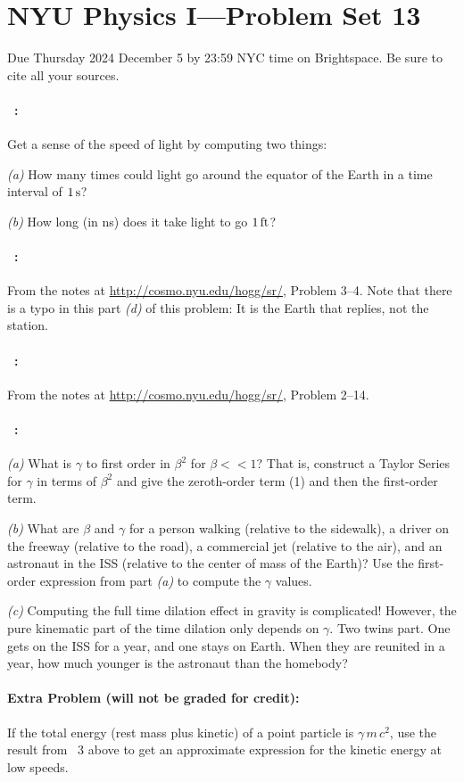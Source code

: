 \documentclass[12pt]{article}
\begin{document}
\section*{NYU Physics I---Problem Set 13}

Due Thursday 2024 December 5 by 23:59 NYC time on Brightspace.
Be sure to cite all your sources.

\paragraph{\problemname~\theproblem:}%
Get a sense of the speed of light by computing two things:

\textsl{(a)} How many times could light go around the equator of the Earth
in a time interval of $1\,\mathrm{s}$?

\textsl{(b)} How long (in ns) does it take light to go $1\,\mathrm{ft}$?

\paragraph{\problemname~\theproblem:}%
From the notes at \url{http://cosmo.nyu.edu/hogg/sr/},
Problem 3--4. Note that there is a typo in this part \textsl{(d)} of this
problem: It is the Earth that replies, not the station.

\paragraph{\problemname~\theproblem:}%
From the notes at \url{http://cosmo.nyu.edu/hogg/sr/},
Problem 2--14.

\paragraph{\problemname~\theproblem:}%
\textsl{(a)} What is $\gamma$ to first order in $\beta^2$ for $\beta
<< 1$? That is, construct a Taylor Series for $\gamma$ in terms of
$\beta^2$ and give the zeroth-order term (1) and then the first-order
term.

\textsl{(b)} What are $\beta$ and $\gamma$ for a person walking
(relative to the sidewalk), a driver on the freeway (relative to the
road), a commercial jet (relative to the air), and an astronaut in the
ISS (relative to the center of mass of the Earth)? Use the first-order
expression from part \textsl{(a)} to compute the $\gamma$ values.

\textsl{(c)} Computing the full time dilation effect in gravity is
complicated! However, the pure kinematic part of the time dilation
only depends on $\gamma$. Two twins part. One gets on the ISS for a
year, and one stays on Earth. When they are reunited in a year, how
much younger is the astronaut than the homebody?

\paragraph{Extra Problem (will not be graded for credit):}%
If the total energy (rest mass plus kinetic) of a point particle is
$\gamma\,m\,c^2$, use the result from \problemname~3 above to get an
approximate expression for the kinetic energy at low speeds.
\end{document}
